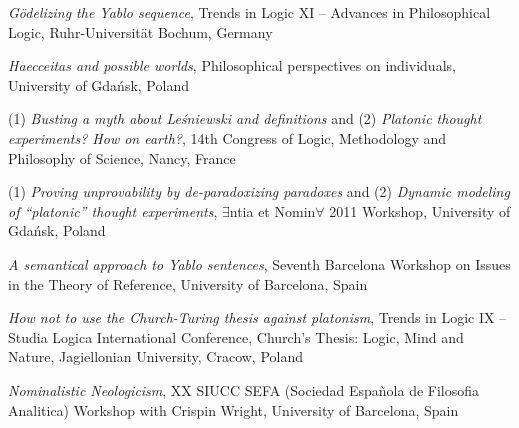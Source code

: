 \documentclass[10pt, a4paper]{article}
\newcommand{\years}[1]{\marginnote{\normalsize #1}}
\begin{document}
\vspace{0.5mm}






\years{2012} \emph{G{\"o}delizing the Yablo sequence}, Trends in Logic XI -- Advances in Philosophical Logic,  Ruhr-Uni\-ver\-si\-t{\"a}t Bochum, Germany


\vspace{0.5mm}



\years{2011} \emph{Haecceitas and possible worlds}, Philosophical perspectives on individuals,  University of Gda\'nsk, Poland


\vspace{0.5mm}






(1) \emph{Busting a myth about Le\' sniewski and definitions} and (2) \emph{Platonic thought experiments? How on earth?}, 14th Congress of Logic, Methodology and Philosophy of Science,  Nancy, France


\vspace{0.5mm}


(1) \emph{Proving unprovability by de-paradoxizing paradoxes} and (2) \emph{Dynamic modeling of ``platonic'' thought experiments}, $\exists$ntia et Nomin$\forall$ 2011 Workshop,  University of Gda\' nsk, Poland





\vspace{0.5mm}



\emph{A semantical approach to Yablo sentences}, Seventh Barcelona Workshop on Issues in the Theory of Re\-fe\-ren\-ce,  University of Barcelona, Spain


\vspace{0.5mm}


\emph{How not to use the Church-Turing thesis against platonism}, Trends in Logic IX -- Studia Logica International Conference, Church's Thesis: Logic, Mind and Nature,  Jagiellonian University, Cracow, Poland


\vspace{0.5mm}


 \emph{Nominalistic Neologicism},  XX SIUCC SEFA (Sociedad Espa\~ nola de Filosofia Analitica) Workshop with Crispin Wright,    University of  Barcelona, Spain
\end{document}
